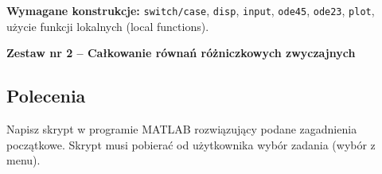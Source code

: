 \documentclass[a4paper,11pt]{article}
\begin{document}
\vspace{0.3cm}
\begin{ramka}
\textbf{Wymagane konstrukcje:}
\texttt{switch/case}, \texttt{disp}, \texttt{input}, \texttt{ode45}, \texttt{ode23}, \texttt{plot}, użycie funkcji lokalnych (local functions).
\end{ramka}

\clearpage
\begin{center}
  {\large\bfseries Zestaw nr 2 \quad -- \quad Całkowanie równań różniczkowych zwyczajnych}
\end{center}
\hrulefill
\vspace{0.4cm}

\subsection*{Polecenia}

Napisz skrypt w programie MATLAB rozwiązujący podane zagadnienia początkowe. Skrypt musi pobierać od użytkownika wybór zadania (wybór z menu).
\end{document}
